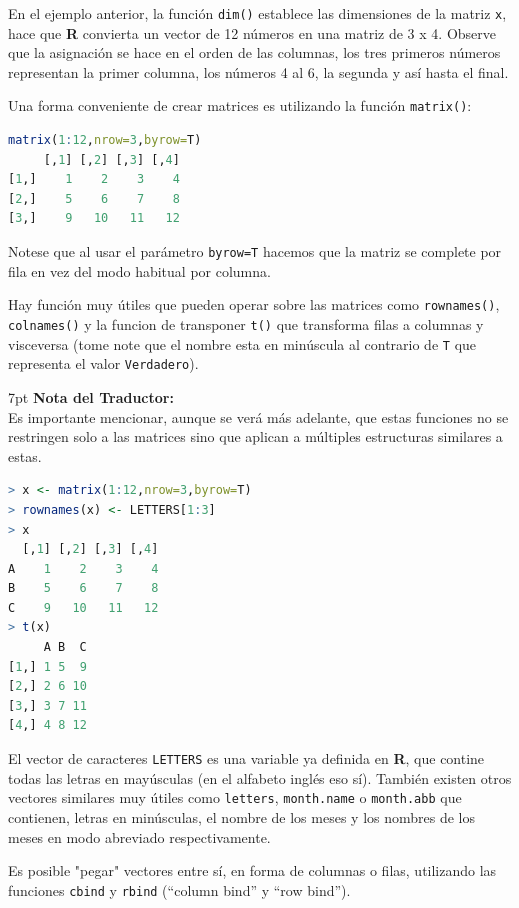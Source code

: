 \documentclass[spanish]{extbook}
\newenvironment{tradnote}{%
  \def\FrameCommand{%
    \hspace{1pt}%
    {\color{darkblue}\vrule width 2pt}%
    {\color{formalshade}\vrule width 4pt}%
    \colorbox{formalshade}%
  }%
  \vspace{12pt}
  \MakeFramed{\advance\hsize-\width\FrameRestore}%
  \noindent\hspace{-4.55pt}%
  \begin{adjustwidth}{}{7pt}%
  \vspace{1pt}%
  \textbf{Nota del Traductor:\\}%
}
{%
  \vspace{6pt}\end{adjustwidth}\endMakeFramed%
}
\numberwithin{equation}{section}
\numberwithin{figure}{section}
\begin{document}
En el ejemplo anterior, la función \texttt{dim()} establece las dimensiones de
la matriz \texttt{x}, hace que \textbf{R} convierta un vector de 12 números en
una matriz de 3 x 4. Observe que la asignación se hace en el orden de las
columnas, los tres primeros números representan la primer columna, los números
4 al 6, la segunda y así hasta el final.

Una forma conveniente de crear matrices es utilizando la función \texttt{matrix()}:

\begin{lstlisting}[language=R]
matrix(1:12,nrow=3,byrow=T)
     [,1] [,2] [,3] [,4]
[1,]    1    2    3    4
[2,]    5    6    7    8
[3,]    9   10   11   12
\end{lstlisting}

Notese que al usar el parámetro \texttt{byrow=T} hacemos que la matriz se
complete por fila en vez del modo habitual por columna.

Hay función muy útiles que pueden operar sobre las matrices como
\texttt{rownames()}, \texttt{colnames()} y la funcion de transponer
\texttt{t()} que transforma filas a columnas y visceversa (tome note que el
nombre esta en minúscula al contrario de \texttt{T} que representa el valor
\texttt{Verdadero}).

\begin{tradnote} Es importante mencionar, aunque se verá más adelante, que
estas funciones no se restringen solo a las matrices sino que aplican a
múltiples estructuras similares a estas.\end{tradnote} \newpage

\begin{lstlisting}[language=R]
> x <- matrix(1:12,nrow=3,byrow=T)
> rownames(x) <- LETTERS[1:3]
> x
  [,1] [,2] [,3] [,4]
A    1    2    3    4
B    5    6    7    8
C    9   10   11   12
> t(x)
     A B  C
[1,] 1 5  9
[2,] 2 6 10
[3,] 3 7 11
[4,] 4 8 12
\end{lstlisting}

El vector de caracteres \texttt{LETTERS} es una variable ya definida en
\textbf{R}, que contine todas las letras en mayúsculas (en el alfabeto inglés
eso sí). También existen otros vectores similares muy útiles como
\texttt{letters}, \texttt{month.name} o \texttt{month.abb} que contienen,
letras en minúsculas, el nombre de los meses y los nombres de los meses en modo
abreviado respectivamente.

Es posible "pegar" vectores entre sí, en forma de columnas o filas, utilizando
las funciones \texttt{cbind} y \texttt{rbind} (``column bind'' y ``row bind'').
\end{document}
